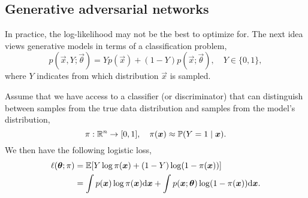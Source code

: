 \subsection{Generative adversarial networks}

In practice, the log-likelihood may not be the best to optimize for. The next idea views generative
models in terms of a classification problem, \[
    p(\vec{x}, Y; \vec{\theta}) = Y p(\vec{x}) + (1 - Y) p(\vec{x}; \vec{\theta}), \quad Y \in \{ 0,1 \},
\]
where $Y$ indicates from which distribution $\vec{x}$ is sampled.

Assume that we have access to a classifier (or discriminator) that can distinguish between samples
from the true data distribution and samples from the model's distribution, \[
    \pi: \mathbb{R}^n \to [0, 1], \quad \pi(\bm{x}) \approx \mathbb{P}(Y = 1 \mid \bm{x}).
\]
We then have the following logistic loss,
\begin{align*}
    \ell(\bm{\theta}; \pi) & = \mathbb{E}[Y \log \pi(\bm{x}) + (1-Y) \log(1-\pi(\bm{x}))]                                                                           \\
                            & = \int p(\bm{x}) \log \pi(\bm{x}) \mathrm{d}\bm{x} + \int p(\bm{x}; \bm{\theta}) \log (1 - \pi(\bm{x})) \mathrm{d}\bm{x}.
\end{align*}

